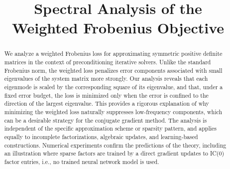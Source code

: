 \documentclass[conference]{IEEEtran}
\begin{document}
\title{Spectral Analysis of the \\ Weighted Frobenius Objective}%

\author{
\and
{}
\and
{}
}


\maketitle

\begin{abstract}
    We analyze a weighted Frobenius loss for approximating symmetric positive definite matrices in the context of preconditioning iterative solvers. Unlike the standard Frobenius norm, the weighted loss penalizes error components associated with small eigenvalues of the system matrix more strongly. Our analysis reveals that each eigenmode is scaled by the corresponding square of its eigenvalue, and that, under a fixed error budget, the loss is minimized only when the error is confined to the direction of the largest eigenvalue. This provides a rigorous explanation of why minimizing the weighted loss naturally suppresses low-frequency components, which can be a desirable strategy for the conjugate gradient method. The analysis is independent of the specific approximation scheme or sparsity pattern, and applies equally to incomplete factorizations, algebraic updates, and learning-based constructions. Numerical experiments confirm the predictions of the theory, including an illustration where sparse factors are trained by a direct gradient updates to IC(0) factor entries, i.e., no trained neural network model is used.
\end{abstract}
\end{document}
